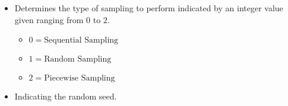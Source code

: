 {\begin{itemize}
\begin{itemize}
        for feature selection, which requires pre-analysis for now, will be
        addresses via other non human work required method.
      \item {}  Determines the
        type of sampling to perform indicated by an integer value given ranging from $0$ to $2$.
        \begin{itemize}
        \item $0 = \text{Sequential Sampling}$
        \item $1 = \text{Random Sampling}$
        \item $2 = \text{Piecewise Sampling}$
        \end{itemize}
        \item {}  Indicating the random seed.
      \end{itemize}
\end{itemize}
}
